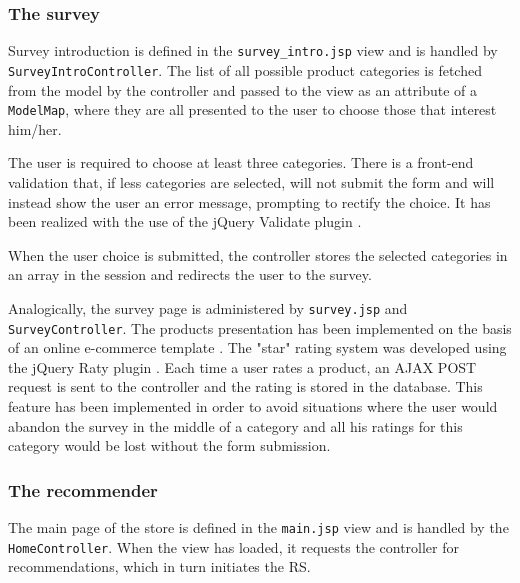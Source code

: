 \documentclass[12pt]{report}
\begin{document}


\subsubsection{The survey}

Survey introduction is defined in the \texttt{survey\-\_intro\-.jsp} view and is handled by \texttt{Survey\-Intro\-Controller}. The list of all possible product categories is fetched from the model by the controller and passed to the view as an attribute of a \texttt{Model\-Map}, where they are all presented to the user to choose those that interest him/her. 

The user is required to choose at least three categories. There is a front-end validation that, if less categories are selected, will not submit the form and will instead show the user an error message, prompting to rectify the choice. It has been realized with the use of the jQuery Validate plugin \cite{jquery_validate}.

When the user choice is submitted, the controller stores the selected categories in an array in the session and redirects the user to the survey.

\hbox{}
Analogically, the survey page is administered by \texttt{survey\-.jsp} and \texttt{Survey\-Controller}. The products presentation has been implemented on the basis of an online e-commerce template \cite{bootply_ecommerce}. The "star" rating system was developed using the jQuery Raty plugin \cite{jquery_raty}. Each time a user rates a product, an AJAX POST request is sent to the controller and the rating is stored in the database. This feature has been implemented in order to avoid situations where the user would abandon the survey in the middle of a category and all his ratings for this category would be lost without the form submission.


\subsubsection{The recommender}

The main page of the store is defined in the \texttt{main\-.jsp} view and is handled by the \texttt{HomeController}. When the view has loaded, it requests the controller for recommendations, which in turn initiates the RS.
\end{document}
